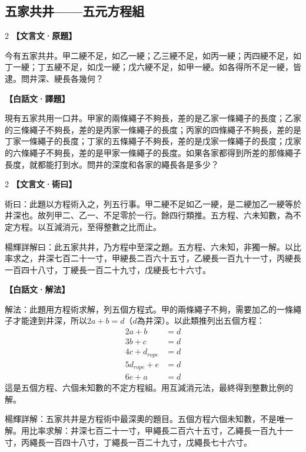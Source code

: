 \documentclass[11pt,a4paper]{article}
\newcommand{\zhc}{}[1]{{\CJKfamily{\CJKrmdefault}#1}}  %
\newcommand{\zhm}[1]{{\CJKfamily{\CJKrmdefault}#1}}  %
\newenvironment{prob bilingual}[1][]{%
  \begin{paracol}{2}%
  \setlength{\columnseprule}{0.4pt}%
}{%
  \end{paracol}%
  \medskip%
}
\begin{document}
\vspace{0.5cm}

\subsection{\zhc{五家共井——五元方程組}}

\begin{paracol}{2}
\switchcolumn[0]
\noindent\textbf{\textcolor{notecolor}{\zhc{【文言文·原題】}}}\par\smallskip
\zhc{
今有五家共井。甲二綆不足，如乙一綆；乙三綆不足，如丙一綆；丙四綆不足，如丁一綆；丁五綆不足，如戊一綆；戊六綆不足，如甲一綆。如各得所不足一綆，皆逮。問井深、綆長各幾何？
}

\switchcolumn[1]
\noindent\textbf{\textcolor{notecolor}{\zhm{【白話文·譯題】}}}\par\smallskip
\zhm{
現有五家共用一口井。甲家的兩條繩子不夠長，差的是乙家一條繩子的長度；乙家的三條繩子不夠長，差的是丙家一條繩子的長度；丙家的四條繩子不夠長，差的是丁家一條繩子的長度；丁家的五條繩子不夠長，差的是戊家一條繩子的長度；戊家的六條繩子不夠長，差的是甲家一條繩子的長度。如果各家都得到所差的那條繩子長度，就都能打到水。問井的深度和各家的繩長各是多少？
}
\end{paracol}

\medskip

\begin{paracol}{2}
\switchcolumn[0]
\noindent\textbf{\textcolor{notecolor}{\zhc{【文言文·術曰】}}}\par\smallskip
\zhc{
術曰：此題以方程術入之，列五行事。甲二綆不足如乙一綆，是二綆加乙一綆等於井深也。故列甲二、乙一、不足零於一行。餘四行類推。五方程、六未知數，為不定方程。以互減消元，至得整數之比而止。

楊輝詳解曰：此五家共井，乃方程中至深之題。五方程、六未知，非獨一解。以比率求之，井深七百二十一寸，甲綆長二百六十五寸，乙綆長一百九十一寸，丙綆長一百四十八寸，丁綆長一百二十九寸，戊綆長七十六寸。
}

\switchcolumn[1]
\noindent\textbf{\textcolor{notecolor}{\zhm{【白話文·解法】}}}\par\smallskip
\zhm{
解法：此題用方程術求解，列五個方程式。甲的兩條繩子不夠，需要加乙的一條繩子才能達到井深，所以$2a + b = d$（$d$為井深）。以此類推列出五個方程：
\begin{align*}
2a + b &= d \\
3b + c &= d \\
4c + d_{rope} &= d \\
5d_{rope} + e &= d \\
6e + a &= d
\end{align*}
這是五個方程、六個未知數的不定方程組。用互減消元法，最終得到整數比例的解。

楊輝詳解：五家共井是方程術中最深奧的題目。五個方程六個未知數，不是唯一解。用比率求解：井深七百二十一寸，甲繩長二百六十五寸，乙繩長一百九十一寸，丙繩長一百四十八寸，丁繩長一百二十九寸，戊繩長七十六寸。
}
\end{paracol}
\end{document}
